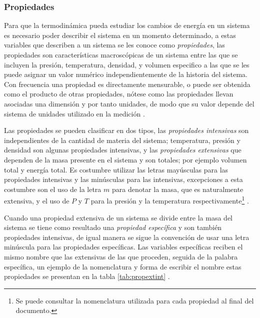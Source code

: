 \documentclass[../master.tex]{subfiles}
\begin{document}
\subsubsection{Propiedades}

Para que la termodinámica pueda estudiar los cambios de energía en un sistema es necesario poder describir el sistema en un momento determinado, a estas variables que describen a un sistema se les conoce como \emph{propiedades}, las propiedades son características macroscópicas de un sistema entre las que se incluyen la presión, temperatura, densidad, y volumen especifico a las que se les puede asignar un valor numérico independientemente de la historia del sistema. Con frecuencia una propiedad es directamente mensurable, o puede ser obtenida como el producto de otras propiedades, nótese como las propiedades llevan asociadas una dimensión y por tanto unidades, de modo que su valor depende del sistema de unidades utilizado en la medición \parencites{moranshapiro}{faires}{wark}.

Las propiedades se pueden clasificar en dos tipos, las \emph{propiedades intensivas} son independientes de la cantidad de materia del sistema; temperatura, presión y densidad son algunas propiedades intensivas, y las \emph{propiedades extensivas} que dependen de la masa presente en el sistema y son totales; por ejemplo volumen total y energía total. Es costumbre utilizar las letras mayúsculas para las propiedades intensivas y las minúsculas para las intensivas, excepciones a esta costumbre son el uso de la letra \( m \) para denotar la masa, que es naturalmente extensiva, y el uso de \( P \) y \( T \) para la presión y la temperatura respectivamente\footnote{Se puede consultar la nomenclatura utilizada para cada propiedad al final del documento.} \parencites{wark}{faires}{cengelt}.

Cuando una propiedad extensiva de un sistema se divide entre la masa del sistema se tiene como resultado una \emph{propiedad específica} y son también propiedades intensivas, de igual manera se sigue la convención de usar una letra minúscula para las propiedades específicas. Las variables específicas reciben el mismo nombre que las extensivas de las que proceden, seguida de la palabra específica, un ejemplo de la nomenclatura y forma de escribir el nombre estas propiedades se presentan en la tabla \ref{tab:propextint} \parencite{wark}.
\end{document}
